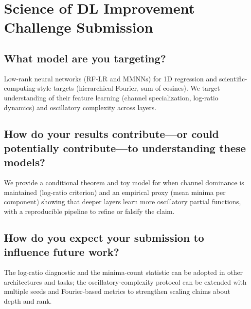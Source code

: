 \documentclass{article}
\theoremstyle{plain}
\theoremstyle{definition}
\begin{document}
\newpage
\section{Science of DL Improvement Challenge Submission}

\subsection{What model are you targeting?}
Low-rank neural networks (RF-LR and MMNNs) for 1D regression and scientific-computing-style targets (hierarchical Fourier, sum of cosines). We target understanding of their feature learning (channel specialization, log-ratio dynamics) and oscillatory complexity across layers.

\subsection{How do your results contribute—or could potentially contribute—to understanding these models?}
We provide a conditional theorem and toy model for when channel dominance is maintained (log-ratio criterion) and an empirical proxy (mean minima per component) showing that deeper layers learn more oscillatory partial functions, with a reproducible pipeline to refine or falsify the claim.

\subsection{How do you expect your submission to influence future work?}
The log-ratio diagnostic and the minima-count statistic can be adopted in other architectures and tasks; the oscillatory-complexity protocol can be extended with multiple seeds and Fourier-based metrics to strengthen scaling claims about depth and rank.
\end{document}

